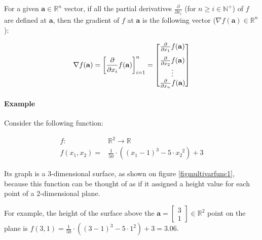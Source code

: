 \documentclass[titlepage]{article}
\begin{document}
            For a given $\mathbf{a} \in \mathbb{R}^n$ vector, if all the
            partial derivatives $\frac{\partial}{\partial x_i}$ (for
            $n \geq i \in \mathbb{N}^+$) of $f$ are defined at $\mathbf{a}$,
            then the gradient of $f$ at $\mathbf{a}$ is the following vector
            ($\nabla f(\mathbf{a}) \in \mathbb{R}^n$):

            \begin{align*}
              \nabla f(\mathbf{a})
                = \left[
                    \frac{\partial}{\partial x_i} f(\mathbf{a})
                  \right]_{i=1}^n
                = \begin{bmatrix}
                    \vspace{1.5ex}
                    \frac{\partial}{\partial x_1} f(\mathbf{a}) \\
                    \frac{\partial}{\partial x_2} f(\mathbf{a}) \\
                    \vdots \\
                    \frac{\partial}{\partial x_n} f(\mathbf{a})
                  \end{bmatrix}
            \end{align*}

          \paragraph{Example}\label{parmultivarexample}

            Consider the following function:

            \begin{align*}
              f : & \mathbb{R}^2 \rightarrow \mathbb{R} \\
              f(x_1, x_2)
                = & \frac{1}{50}
                    \cdot
                    \left( (x_1 - 1)^3 - 5 \cdot x_2^{\enspace 2} \right) + 3
            \end{align*}

            Its graph is a 3-dimensional surface, as shown on figure
            \ref{figmultivarfunc1}, because this function can be thought of as
            if it assigned a height value for each point of a 2-dimensional
            plane.

            For example, the height of the surface above the
            $\mathbf{a} = \begin{bmatrix}3 \\ 1\end{bmatrix} \in \mathbb{R}^2$
            point on the plane is
            $
              f(3, 1)
                = \frac{1}{50} \cdot \left( (3-1)^3 - 5 \cdot 1^2 \right) + 3
                = 3.06
            $.
\end{document}
